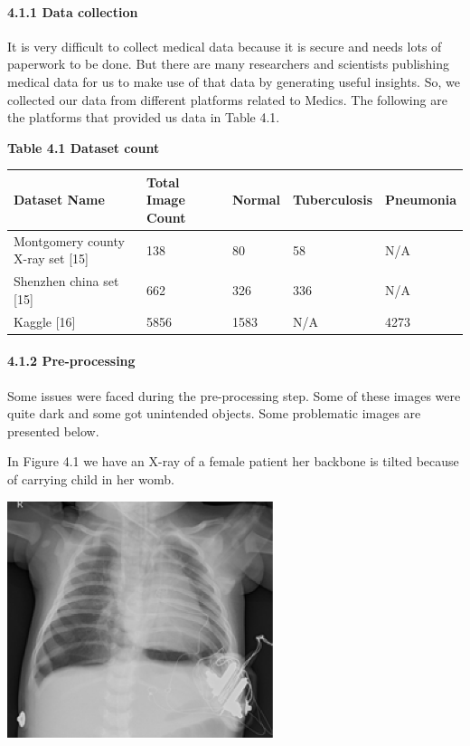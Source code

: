 \documentclass{article} %
\begin{document}
\noindent 
\paragraph{4.1.1 Data collection}

\noindent It is very difficult to collect medical data because it is secure and needs lots of paperwork to be done. But there are many researchers and scientists publishing medical data for us to make use of that data by generating useful insights. So, we collected our data from different platforms related to Medics. The following are the platforms that provided us data in Table 4.1.

\noindent \textbf{Table 4.1 Dataset count}

\begin{tabular}{|p{1.5in}|p{0.9in}|p{0.5in}|p{0.7in}|p{0.6in}|} \hline 
\textbf{Dataset Name} & \textbf{Total Image Count} & \textbf{Normal} & \textbf{Tuberculosis} & \textbf{Pneumonia} \\ \hline 
Montgomery county X-ray set [15] & 138 & 80 & 58 & N/A \\ \hline 
Shenzhen china set [15] & 662 & 326 & 336 & N/A \\ \hline 
Kaggle [16] & 5856 & 1583 & N/A & 4273 \\ \hline 
\end{tabular}



\noindent 
\paragraph{4.1.2 Pre-processing}

\noindent Some issues were faced during the pre-processing step. Some of these images were quite dark  and some got unintended objects. Some problematic images are presented below.

\noindent In Figure 4.1 we have an X-ray of a female patient her backbone is tilted because of carrying child in her womb.

\noindent \includegraphics*[width=3.07in, height=2.73in, keepaspectratio=false]{image15}
\end{document}
